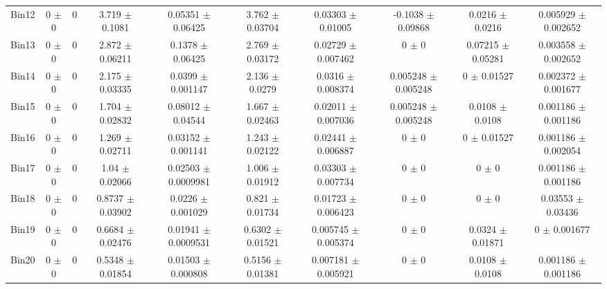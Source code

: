 \begin{tabular}{@{\extracolsep{4pt}}lccccccccc@{}}
     Bin12 & 0 $\pm$ 0 & 0 & 3.719 $\pm$ 0.1081 & 0.05351 $\pm$ 0.06425 & 3.762 $\pm$ 0.03704 & 0.03303 $\pm$ 0.01005 & -0.1038 $\pm$ 0.09868 & 0.0216 $\pm$ 0.0216 & 0.005929 $\pm$ 0.002652 \\ 
     Bin13 & 0 $\pm$ 0 & 0 & 2.872 $\pm$ 0.06211 & 0.1378 $\pm$ 0.06425 & 2.769 $\pm$ 0.03172 & 0.02729 $\pm$ 0.007462 & 0 $\pm$ 0 & 0.07215 $\pm$ 0.05281 & 0.003558 $\pm$ 0.002652 \\ 
     Bin14 & 0 $\pm$ 0 & 0 & 2.175 $\pm$ 0.03335 & 0.0399 $\pm$ 0.001147 & 2.136 $\pm$ 0.0279 & 0.0316 $\pm$ 0.008374 & 0.005248 $\pm$ 0.005248 & 0 $\pm$ 0.01527 & 0.002372 $\pm$ 0.001677 \\ 
     Bin15 & 0 $\pm$ 0 & 0 & 1.704 $\pm$ 0.02832 & 0.08012 $\pm$ 0.04544 & 1.667 $\pm$ 0.02463 & 0.02011 $\pm$ 0.007036 & 0.005248 $\pm$ 0.005248 & 0.0108 $\pm$ 0.0108 & 0.001186 $\pm$ 0.001186 \\ 
     Bin16 & 0 $\pm$ 0 & 0 & 1.269 $\pm$ 0.02711 & 0.03152 $\pm$ 0.001141 & 1.243 $\pm$ 0.02122 & 0.02441 $\pm$ 0.006887 & 0 $\pm$ 0 & 0 $\pm$ 0.01527 & 0.001186 $\pm$ 0.002054 \\ 
     Bin17 & 0 $\pm$ 0 & 0 & 1.04 $\pm$ 0.02066 & 0.02503 $\pm$ 0.0009981 & 1.006 $\pm$ 0.01912 & 0.03303 $\pm$ 0.007734 & 0 $\pm$ 0 & 0 $\pm$ 0 & 0.001186 $\pm$ 0.001186 \\ 
     Bin18 & 0 $\pm$ 0 & 0 & 0.8737 $\pm$ 0.03902 & 0.0226 $\pm$ 0.001029 & 0.821 $\pm$ 0.01734 & 0.01723 $\pm$ 0.006423 & 0 $\pm$ 0 & 0 $\pm$ 0 & 0.03553 $\pm$ 0.03436 \\ 
     Bin19 & 0 $\pm$ 0 & 0 & 0.6684 $\pm$ 0.02476 & 0.01941 $\pm$ 0.0009531 & 0.6302 $\pm$ 0.01521 & 0.005745 $\pm$ 0.005374 & 0 $\pm$ 0 & 0.0324 $\pm$ 0.01871 & 0 $\pm$ 0.001677 \\ 
     Bin20 & 0 $\pm$ 0 & 0 & 0.5348 $\pm$ 0.01854 & 0.01503 $\pm$ 0.000808 & 0.5156 $\pm$ 0.01381 & 0.007181 $\pm$ 0.005921 & 0 $\pm$ 0 & 0.0108 $\pm$ 0.0108 & 0.001186 $\pm$ 0.001186 \\ 
\hline\hline
  \end{tabular}

